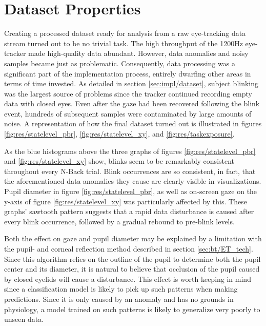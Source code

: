 \section{Dataset Properties} \label{sec:disc/dataset}

Creating a processed dataset ready for analysis from a raw eye-tracking data stream turned out to be no trivial task. The high throughput of the 1200Hz eye-tracker made high-quality data abundant. However, data anomalies and noisy samples became just as problematic. Consequently, data processing was a significant part of the implementation process, entirely dwarfing other areas in terms of time invested. As detailed in section \ref{sec:impl/dataset}, subject blinking was the largest source of problems since the tracker continued recording empty data with closed eyes. Even after the gaze had been recovered following the blink event, hundreds of subsequent samples were contaminated by large amounts of noise. A representation of how the final dataset turned out is illustrated in figures \ref{fig:res/statelevel_pbr}, \ref{fig:res/statelevel_xy}, and \ref{fig:res/taskexposure}.

As the blue histograms above the three graphs of figures \ref{fig:res/statelevel_pbr} and \ref{fig:res/statelevel_xy} show, blinks seem to be remarkably consistent throughout every N-Back trial. Blink occurrences are so consistent, in fact, that the aforementioned data anomalies they cause are clearly visible in visualizations. Pupil diameter in figure \ref{fig:res/statelevel_pbr}, as well as on-screen gaze on the y-axis of figure \ref{fig:res/statelevel_xy} was particularly affected by this. These graphs' sawtooth pattern suggests that a rapid data disturbance is caused after every blink occurrence, followed by a gradual rebound to pre-blink levels. 

Both the effect on gaze and pupil diameter may be explained by a limitation with the pupil- and corneal reflection method described in section \ref{sec:bt/ET_tech}. Since this algorithm relies on the outline of the pupil to determine both the pupil center and its diameter, it is natural to believe that occlusion of the pupil caused by closed eyelids will cause a disturbance. This effect is worth keeping in mind since a classification model is likely to pick up such patterns when making predictions. Since it is only caused by an anomaly and has no grounds in physiology, a model trained on such patterns is likely to generalize very poorly to unseen data.


